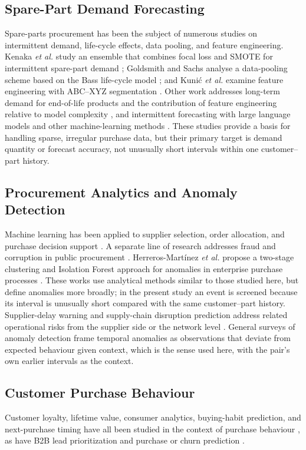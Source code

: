 \documentclass[conference]{IEEEtran}
\begin{document}
\subsection{Spare-Part Demand Forecasting}
Spare-parts procurement has been the subject of numerous studies on intermittent demand, life-cycle effects, data pooling, and feature engineering. Kenaka \textit{et al.} study an ensemble that combines focal loss and SMOTE for intermittent spare-part demand \cite{kenaka2025}; Goldsmith and Sachs analyse a data-pooling scheme based on the Bass life-cycle model \cite{goldsmith2025}; and Kuni\'c \textit{et al.} examine feature engineering with ABC--XYZ segmentation \cite{kunic2026}. Other work addresses long-term demand for end-of-life products and the contribution of feature engineering relative to model complexity \cite{nathan2026long,nathan2026feature}, and intermittent forecasting with large language models and other machine-learning methods \cite{nakhost2025,giannopoulos2025}. These studies provide a basis for handling sparse, irregular purchase data, but their primary target is demand quantity or forecast accuracy, not unusually short intervals within one customer--part history.

\subsection{Procurement Analytics and Anomaly Detection}
Machine learning has been applied to supplier selection, order allocation, and purchase decision support \cite{supplierallocation2025,balkan2025}. A separate line of research addresses fraud and corruption in public procurement \cite{schneider2025,ndolo2025}. Herreros-Mart\'inez \textit{et al.} propose a two-stage clustering and Isolation Forest approach for anomalies in enterprise purchase processes \cite{herreros2025}. These works use analytical methods similar to those studied here, but define anomalies more broadly; in the present study an event is screened because its interval is unusually short compared with the same customer--part history. Supplier-delay warning and supply-chain disruption prediction address related operational risks from the supplier side or the network level \cite{alaoua2025,xiaoyang2025,khaled2024,wyrembek2025,xia2026}. General surveys of anomaly detection \cite{chandola2009} frame temporal anomalies as observations that deviate from expected behaviour given context, which is the sense used here, with the pair's own earlier intervals as the context.

\subsection{Customer Purchase Behaviour}
Customer loyalty, lifetime value, consumer analytics, buying-habit prediction, and next-purchase timing have all been studied in the context of purchase behaviour \cite{roosta2025,wong2025,stylianou2025,wang2025,lou2026,simon2025}, as have B2B lead prioritization and purchase or churn prediction \cite{gonzalez2025,obrien2025}.
\end{document}
